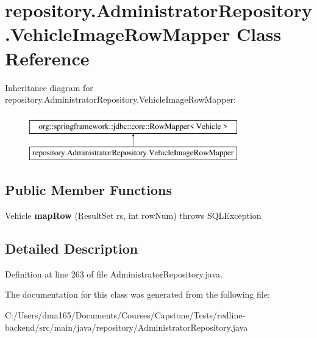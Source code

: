\hypertarget{classrepository_1_1_administrator_repository_1_1_vehicle_image_row_mapper}{}\section{repository.\+Administrator\+Repository.\+Vehicle\+Image\+Row\+Mapper Class Reference}
\label{classrepository_1_1_administrator_repository_1_1_vehicle_image_row_mapper}
Inheritance diagram for repository.\+Administrator\+Repository.\+Vehicle\+Image\+Row\+Mapper\+:\begin{figure}[H]
\begin{center}
\leavevmode
\includegraphics[height=2.000000cm]{classrepository_1_1_administrator_repository_1_1_vehicle_image_row_mapper}
\end{center}
\end{figure}
\subsection*{Public Member Functions}
\begin{DoxyCompactItemize}
\item 
\mbox{\label{classrepository_1_1_administrator_repository_1_1_vehicle_image_row_mapper_a7cf6226712715d9029ba5bec47305c78}} 
Vehicle {\bfseries map\+Row} (Result\+Set rs, int row\+Num)  throws S\+Q\+L\+Exception 
\end{DoxyCompactItemize}


\subsection{Detailed Description}


Definition at line 263 of file Administrator\+Repository.\+java.



The documentation for this class was generated from the following file\+:\begin{DoxyCompactItemize}
\item 
C\+:/\+Users/dma165/\+Documents/\+Courses/\+Capstone/\+Tests/redline-\/backend/src/main/java/repository/Administrator\+Repository.\+java\end{DoxyCompactItemize}
